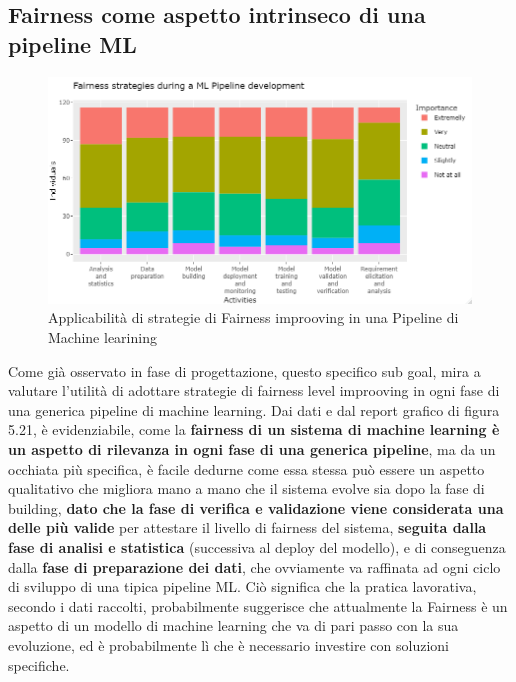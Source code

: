 	
    \subsection{Fairness come aspetto intrinseco di una pipeline ML}

    	\begin{center}
    	\hspace*{-5mm}%
    \end{center}
    
     \begin{figure}[h!]
        \centering
        \includegraphics[width=1\textwidth]{figure/Analisi/RQ4/Fairness strategies during a ML Pipeline development.png}
        \caption{Applicabilità di strategie di Fairness improoving in una Pipeline di Machine learining}
    \end{figure}
    Come già osservato in fase di progettazione, questo specifico sub goal, mira a valutare l'utilità di adottare strategie di fairness level improoving in ogni fase di una generica pipeline di machine learning. Dai dati e dal report grafico di figura 5.21, è  evidenziabile, come la \textbf{fairness di un sistema di machine learning è un aspetto di rilevanza in ogni fase di una generica pipeline}, ma da un occhiata più specifica, è facile dedurne come essa stessa può essere un aspetto qualitativo che migliora mano a mano che il sistema evolve sia dopo la fase di building, \textbf{dato che la fase di verifica e validazione viene considerata una delle più valide} per attestare il livello di fairness del sistema, \textbf{seguita dalla fase di analisi e statistica} (successiva al deploy del modello), e di conseguenza dalla \textbf{fase di preparazione dei dati}, che ovviamente va raffinata ad ogni ciclo di sviluppo di una tipica pipeline ML. Ciò significa che la pratica lavorativa, secondo i dati raccolti, probabilmente suggerisce che attualmente la Fairness è un aspetto di un modello di machine learning che va di pari passo con la sua evoluzione, ed è probabilmente lì che è necessario investire con soluzioni specifiche.
    
